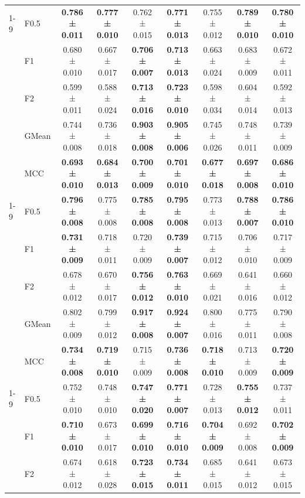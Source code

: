 \begin{table}[H]
{\begin{tabular}{llccccccc}
\cline{1-9}
\multirow[t]{5}{*}{RandomForest} & F0.5 & \textbf{0.786 ± 0.011} & \textbf{0.777 ± 0.010} & 0.762 ± 0.015 & \textbf{0.771 ± 0.013} & 0.755 ± 0.012 & \textbf{0.789 ± 0.010} & \textbf{0.780 ± 0.010} \\
 & F1 & 0.680 ± 0.010 & 0.667 ± 0.017 & \textbf{0.706 ± 0.007} & \textbf{0.713 ± 0.013} & 0.663 ± 0.024 & 0.683 ± 0.009 & 0.672 ± 0.011 \\
 & F2 & 0.599 ± 0.011 & 0.588 ± 0.024 & \textbf{0.713 ± 0.016} & \textbf{0.723 ± 0.010} & 0.598 ± 0.034 & 0.604 ± 0.014 & 0.592 ± 0.013 \\
 & GMean & 0.744 ± 0.008 & 0.736 ± 0.018 & \textbf{0.903 ± 0.008} & \textbf{0.905 ± 0.006} & 0.745 ± 0.026 & 0.748 ± 0.011 & 0.739 ± 0.009 \\
 & MCC & \textbf{0.693 ± 0.010} & \textbf{0.684 ± 0.013} & \textbf{0.700 ± 0.009} & \textbf{0.701 ± 0.010} & \textbf{0.677 ± 0.018} & \textbf{0.697 ± 0.008} & \textbf{0.686 ± 0.010} \\
\cline{1-9}
\multirow[t]{5}{*}{TabICL} & F0.5 & \textbf{0.796 ± 0.008} & 0.775 ± 0.008 & \textbf{0.785 ± 0.008} & \textbf{0.795 ± 0.008} & 0.773 ± 0.013 & \textbf{0.788 ± 0.007} & \textbf{0.786 ± 0.010} \\
 & F1 & \textbf{0.731 ± 0.009} & 0.718 ± 0.011 & 0.720 ± 0.009 & \textbf{0.739 ± 0.007} & 0.715 ± 0.012 & 0.706 ± 0.010 & 0.717 ± 0.009 \\
 & F2 & 0.678 ± 0.012 & 0.670 ± 0.017 & \textbf{0.756 ± 0.012} & \textbf{0.763 ± 0.010} & 0.669 ± 0.021 & 0.641 ± 0.016 & 0.660 ± 0.012 \\
 & GMean & 0.802 ± 0.009 & 0.799 ± 0.012 & \textbf{0.917 ± 0.008} & \textbf{0.924 ± 0.007} & 0.800 ± 0.016 & 0.775 ± 0.011 & 0.790 ± 0.008 \\
 & MCC & \textbf{0.734 ± 0.008} & \textbf{0.719 ± 0.010} & 0.715 ± 0.009 & \textbf{0.736 ± 0.008} & \textbf{0.718 ± 0.010} & 0.713 ± 0.009 & \textbf{0.720 ± 0.009} \\
\cline{1-9}
\multirow[t]{5}{*}{TabM} & F0.5 & 0.752 ± 0.010 & 0.748 ± 0.010 & \textbf{0.747 ± 0.020} & \textbf{0.771 ± 0.007} & 0.728 ± 0.013 & \textbf{0.755 ± 0.012} & 0.737 ± 0.011 \\
 & F1 & \textbf{0.710 ± 0.010} & 0.673 ± 0.017 & \textbf{0.699 ± 0.010} & \textbf{0.716 ± 0.010} & \textbf{0.704 ± 0.009} & 0.692 ± 0.008 & \textbf{0.702 ± 0.009} \\
 & F2 & 0.674 ± 0.012 & 0.618 ± 0.028 & \textbf{0.723 ± 0.015} & \textbf{0.734 ± 0.011} & 0.685 ± 0.015 & 0.641 ± 0.012 & 0.673 ± 0.015 \\

\end{tabular}}
\end{table}
